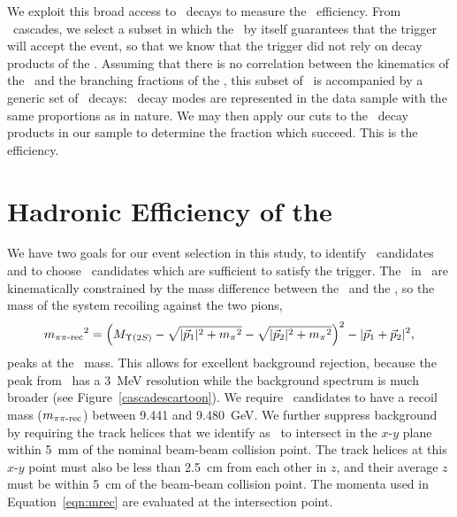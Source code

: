 \documentclass{cornell}
\begin{document}
We exploit this broad access to \us\ decays to measure the \us\
efficiency.  From \twotoone\ cascades, we select a subset in which the
\pipi\ by itself guarantees that the trigger will accept the event, so
that we know that the trigger did not rely on decay products of the
\us.  Assuming that there is no correlation between the kinematics of
the \pipi\ and the branching fractions of the \us, this subset of
\pipi\ is accompanied by a generic set of \us\ decays: \us\ decay
modes are represented in the data sample with the same proportions as
in nature.  We may then apply our cuts to the \us\ decay products in
our sample to determine the fraction which succeed.  This is the
efficiency.

\section{Hadronic Efficiency of the \boldmath \us}
\label{sec:usefficiency}

We have two goals for our event selection in this study, to identify
\twotoone\ candidates and to choose \pipi\ candidates which are
sufficient to satisfy the trigger.  The \pipi\ in \twotoone\ are
kinematically constrained by the mass difference between the \uss\ and
the \us, so the mass of the system recoiling against the two pions,
\begin{equation}
  {m_{\mbox{\scriptsize $\pi\pi$-rec}}}^2 = \left(M_{\Upsilon(2S)} - \sqrt{|\vec{p}_1|^2 + {m_\pi}^2}
  - \sqrt{|\vec{p}_2|^2 + {m_\pi}^2}\right)^2 - |\vec{p}_1 + \vec{p}_2|^2 \mbox{,}
  \label{eqn:mrec}
\end{equation}
peaks at the \us\ mass.  This allows for excellent background
rejection, because the peak from \twotoone\ has a 3~MeV resolution
while the background spectrum is much broader (see Figure~\ref{cascadescartoon}).  We require \pipi\ candidates to have a recoil
mass ($m_{\mbox{\scriptsize $\pi\pi$-rec}}$) between 9.441 and 9.480~GeV.  We
further suppress background by requiring the track helices that we
identify as \pipi\ to intersect in the $x$-$y$ plane within 5~mm of
the nominal beam-beam collision point.  The track helices at this $x$-$y$
point must also be less than 2.5~cm from each other in $z$, and their
average $z$ must be within 5~cm of the beam-beam collision point.  The
momenta used in Equation~\ref{eqn:mrec} are evaluated at the
intersection point.
\end{document}
